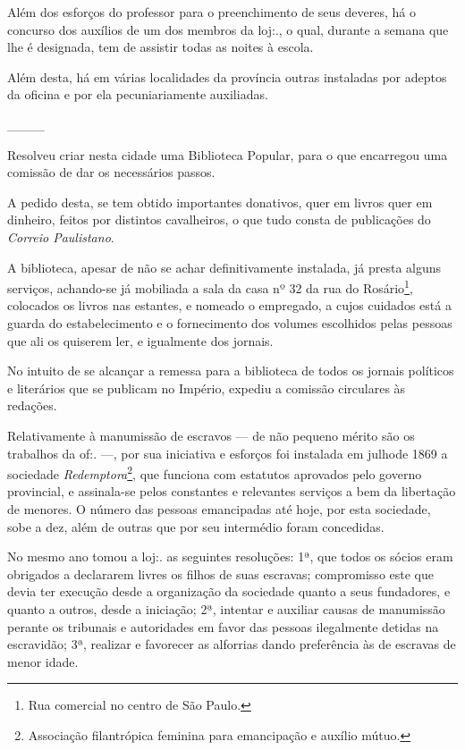 Além dos esforços do professor para o preenchimento de seus deveres, há
o concurso dos auxílios de um dos membros da loj:., o qual, durante a
semana que lhe é designada, tem de assistir todas as noites à escola.

Além desta, há em várias localidades da província outras instaladas por
adeptos da oficina e por ela pecuniariamente auxiliadas.

\_\_\_\_

Resolveu criar nesta cidade uma Biblioteca Popular, para o que
encarregou uma comissão de dar os necessários passos.

A pedido desta, se tem obtido importantes donativos, quer em livros quer
em dinheiro, feitos por distintos cavalheiros, o que tudo consta de
publicações do \emph{Correio Paulistano}.

A biblioteca, apesar de não se achar definitivamente instalada, já
presta alguns serviços, achando-se já mobiliada a sala da casa nº 32 da
rua do Rosário\footnote{ Rua comercial no centro de São Paulo.},
colocados os livros nas estantes, e nomeado o empregado, a cujos
cuidados está a guarda do estabelecimento e o fornecimento dos volumes
escolhidos pelas pessoas que ali os quiserem ler, e igualmente dos
jornais.

No intuito de se alcançar a remessa para a biblioteca de todos os
jornais políticos e literários que se publicam no Império, expediu a
comissão circulares às redações.

\asterisc

Relativamente à manumissão de escravos --- de não pequeno mérito são os
trabalhos da of:. ---, por sua iniciativa e esforços foi instalada em
julhode 1869 a sociedade \emph{Redemptora}\footnote{ Associação
  filantrópica feminina para emancipação e auxílio mútuo.}, que funciona
com estatutos aprovados pelo governo provincial, e assinala-se pelos
constantes e relevantes serviços a bem da libertação de menores. O
número das pessoas emancipadas até hoje, por esta sociedade, sobe a dez,
além de outras que por seu intermédio foram concedidas.

No mesmo ano tomou a loj:. as seguintes resoluções: 1ª, que todos os
sócios eram obrigados a declararem livres os filhos de suas escravas;
compromisso este que devia ter execução desde a organização da sociedade
quanto a seus fundadores, e quanto a outros, desde a iniciação; 2ª,
intentar e auxiliar causas de manumissão perante os tribunais e
autoridades em favor das pessoas ilegalmente detidas na escravidão; 3ª,
realizar e favorecer as alforrias dando preferência às de escravas de
menor idade.

